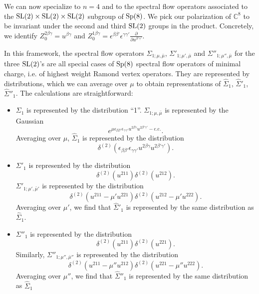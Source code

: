 \documentclass[11pt,a4paper]{article}
\begin{document}
We can now specialize to $n=4$ and to the spectral flow operators associated to the ${\mathrm{SL}}(2) \times {\mathrm{SL}}(2) \times {\mathrm{SL}}(2)$ subgroup of ${\mathrm{Sp}}(8)$. 
We pick our polarization of $\mathbb{C}^{8}$ to be invariant under the second and third ${\mathrm{SL}}(2)$ groups in the product. Concretely, we identify 
$Z_0^{2 \beta \gamma} = u^{\beta \gamma}$ and $Z_0^{1 \beta \gamma}=\epsilon^{\beta\beta'}\epsilon^{\gamma\gamma'}\frac{\partial}{\partial u^{\beta'\gamma'}} .$

In this framework, the spectral flow operators $\Sigma_{1;\mu, \bar \mu}$, $\Sigma'_{1;\mu', \bar \mu}$ and $\Sigma''_{1;\mu'', \bar \mu}$ for the three ${\mathrm{SL}}(2)$'s are all special cases of ${\mathrm{Sp}}(8)$ spectral flow operators of minimal charge, i.e. of highest weight Ramond vertex operators. They are represented by distributions, which we can average over $\mu$ to obtain representations of $\hat \Sigma_{1}$, $\hat \Sigma'_{1}$, $\hat \Sigma''_{1}$. The calculations are straightforward:
\begin{itemize}
\item $\Sigma_1$ is represented by the distribution ``1''. $\Sigma_{1;\mu, \bar \mu}$ is represented by the Gaussian
\begin{equation}
e^{\mu  \epsilon_{\beta \beta'}\epsilon_{\gamma \gamma'} u^{2\beta \gamma} u^{2 \beta' \gamma'}- \mathrm{c.c.}}.
\end{equation} Averaging over $\mu$, $\hat \Sigma_{1}$ is represented by the distribution
\begin{equation}
\delta^{(2)}(\epsilon_{\beta \beta'}\epsilon_{\gamma \gamma'} u^{2\beta \gamma} u^{2 \beta' \gamma'}).
\end{equation}
\item $\Sigma'_1$ is represented by the distribution 
\begin{equation}
\delta^{(2)}(u^{211})\delta^{(2)}(u^{212}).
\end{equation}
 $\Sigma'_{1;\mu', \bar \mu'}$ is represented by the distribution 
\begin{equation}
\delta^{(2)}(u^{211}- \mu' u^{221})\delta^{(2)}(u^{212}- \mu' u^{222}).
\end{equation}
 Averaging over $\mu'$, we find that $\hat \Sigma'_{1}$ is represented by the same distribution as $\hat \Sigma_{1}$.
\item $\Sigma''_1$ is represented by the distribution 
\begin{equation}
\delta^{(2)}(u^{211})\delta^{(2)}(u^{221}).
\end{equation}
Similarly,  $\Sigma''_{1;\mu'', \bar \mu''}$ is represented by the distribution 
\begin{equation}
\delta^{(2)}(u^{211}- \mu'' u^{212})\delta^{(2)}(u^{221}- \mu'' u^{222}).
\end{equation}
 Averaging over $\mu''$, we find that $\hat \Sigma''_{1}$ is represented by the same distribution as $\hat \Sigma_{1}$
\end{itemize}
\end{document}

